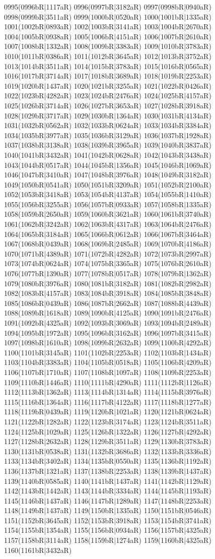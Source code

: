 0995(0996bR|1117aR) 0996(0997bR|3182aR) 0997(0998bR|0940aR) 0998(0999bR|3511aR) 0999(1000bR|0520aR) 1000(1001bR|1335aR) 1001(1002bR|0893aR) 1002(1003bR|3141aR) 1003(1004bR|2670aR) 1004(1005bR|0938aR) 1005(1006bR|4151aR) 1006(1007bR|2610aR) 1007(1008bR|1332aR) 1008(1009bR|3383aR) 1009(1010bR|3783aR) 1010(1011bR|0386aR) 1011(1012bR|3645aR) 1012(1013bR|3752aR) 1013(1014bR|3511aR) 1014(1015bR|3783aR) 1015(1016bR|0565aR) 1016(1017bR|3714aR) 1017(1018bR|3689aR) 1018(1019bR|2253aR) 1019(1020bR|1437aR) 1020(1021bR|3255aR) 1021(1022bR|0426aR) 1022(1023bR|4282aR) 1023(1024bR|2476aR) 1024(1025bR|4157aR) 1025(1026bR|3714aR) 1026(1027bR|3653aR) 1027(1028bR|3918aR) 1028(1029bR|3717aR) 1029(1030bR|1364aR) 1030(1031bR|4134aR) 1031(1032bR|0562aR) 1032(1033bR|0624aR) 1033(1034bR|3384aR) 1034(1035bR|3977aR) 1035(1036bR|3129aR) 1036(1037bR|1928aR) 1037(1038bR|3138aR) 1038(1039bR|3965aR) 1039(1040bR|3837aR) 1040(1041bR|3432aR) 1041(1042bR|0628aR) 1042(1043bR|3438aR) 1043(1044bR|0517aR) 1044(1045bR|1356aR) 1045(1046bR|1069aR) 1046(1047bR|3410aR) 1047(1048bR|3976aR) 1048(1049bR|3182aR) 1049(1050bR|0541aR) 1050(1051bR|3209aR) 1051(1052bR|2100aR) 1052(1053bR|3418aR) 1053(1054bR|4137aR) 1054(1055bR|1410aR) 1055(1056bR|3255aR) 1056(1057bR|0933aR) 1057(1058bR|1335aR) 1058(1059bR|2650aR) 1059(1060bR|3621aR) 1060(1061bR|3740aR) 1061(1062bR|3242aR) 1062(1063bR|4317aR) 1063(1064bR|2476aR) 1064(1065bR|3184aR) 1065(1066bR|0612aR) 1066(1067bR|3464aR) 1067(1068bR|0439aR) 1068(1069bR|2485aR) 1069(1070bR|4186aR) 1070(1071bR|4389aR) 1071(1072bR|4282aR) 1072(1073bR|2997aR) 1073(1074bR|0624aR) 1074(1075bR|3365aR) 1075(1076bR|2610aR) 1076(1077bR|1390aR) 1077(1078bR|0517aR) 1078(1079bR|1362aR) 1079(1080bR|3976aR) 1080(1081bR|3182aR) 1081(1082bR|2982aR) 1082(1083bR|4157aR) 1083(1084bR|3918aR) 1084(1085bR|3848aR) 1085(1086bR|0439aR) 1086(1087bR|2662aR) 1087(1088bR|4439aR) 1088(1089bR|1618aR) 1089(1090bR|4125aR) 1090(1091bR|2476aR) 1091(1092bR|4325aR) 1092(1093bR|3069aR) 1093(1094bR|2489aR) 1094(1095bR|1972aR) 1095(1096bR|3162aR) 1096(1097bR|3415aR) 1097(1098bR|1610aR) 1098(1099bR|2632aR) 1099(1100bR|4292aR) 1100(1101bR|3145aR) 1101(1102bR|2253aR) 1102(1103bR|1434aR) 1103(1104bR|3383aR) 1104(1105bR|0518aR) 1105(1106bR|4209aR) 1106(1107bR|1710aR) 1107(1108bR|1097aR) 1108(1109bR|2253aR) 1109(1110bR|1446aR) 1110(1111bR|4290aR) 1111(1112bR|1126aR) 1112(1113bR|1362aR) 1113(1114bR|1314aR) 1114(1115bR|3976aR) 1115(1116bR|1364aR) 1116(1117bR|4122aR) 1117(1118bR|1277aR) 1118(1119bR|0439aR) 1119(1120bR|1021aR) 1120(1121bR|0624aR) 1121(1122bR|1282aR) 1122(1123bR|3174aR) 1123(1124bR|3511aR) 1124(1125bR|1029aR) 1125(1126bR|1322aR) 1126(1127bR|4292aR) 1127(1128bR|2632aR) 1128(1129bR|3511aR) 1129(1130bR|3783aR) 1130(1131bR|0538aR) 1131(1132bR|3686aR) 1132(1133bR|3336aR) 1133(1134bR|3402aR) 1134(1135bR|0550aR) 1135(1136bR|1192aR) 1136(1137bR|1321aR) 1137(1138bR|2253aR) 1138(1139bR|1437aR) 1139(1140bR|0585aR) 1140(1141bR|1437aR) 1141(1142bR|1129aR) 1142(1143bR|1442aR) 1143(1144bR|3334aR) 1144(1145bR|1193aR) 1145(1146bR|1437aR) 1146(1147bR|1289aR) 1147(1148bR|2253aR) 1148(1149bR|1437aR) 1149(1150bR|1335aR) 1150(1151bR|0546aR) 1151(1152bR|3645aR) 1152(1153bR|3918aR) 1153(1154bR|3741aR) 1154(1155bR|1354aR) 1155(1156bR|0934aR) 1156(1157bR|4325aR) 1157(1158bR|3114aR) 1158(1159bR|1274aR) 1159(1160bR|4325aR) 1160(1161bR|3432aR) 